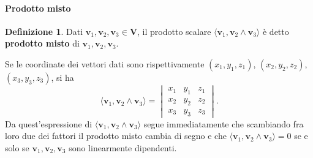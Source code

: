 \documentclass{article}
\theoremstyle{plain}
\theoremstyle{definition}
\newtheorem{defn}{Definizione}[section]
\theoremstyle{remark}
\begin{document}
\vspace{10pt}

\paragraph{Prodotto misto}
\begin{bxthm}
\begin{defn}
Dati $\mathbf{v}_1, \mathbf{v}_2, \mathbf{v}_3 \in \mathbf{V}$, il prodotto scalare 
$\langle \mathbf{v}_1, \mathbf{v}_2 \wedge \mathbf{v}_3 \rangle$ è detto \textbf{prodotto misto} 
di $\mathbf{v}_1, \mathbf{v}_2, \mathbf{v}_3$.
\end{defn}
\end{bxthm}

\vspace{10pt}

Se le coordinate dei vettori dati sono rispettivamente $(x_1, y_1, z_1)$, $(x_2, y_2, z_2)$, $(x_3, y_3, z_3)$, si ha
\[
\langle \mathbf{v}_1, \mathbf{v}_2 \wedge \mathbf{v}_3 \rangle = 
\begin{vmatrix}
x_1 & y_1 & z_1 \\
x_2 & y_2 & z_2 \\
x_3 & y_3 & z_3
\end{vmatrix}.
\]
Da quest'espressione di $\langle \mathbf{v}_1, \mathbf{v}_2 \wedge \mathbf{v}_3 \rangle$ segue immediatamente 
che scambiando fra loro due dei fattori il prodotto misto cambia di segno e che 
$\langle \mathbf{v}_1, \mathbf{v}_2 \wedge \mathbf{v}_3 \rangle = 0$ se e solo se 
$\mathbf{v}_1, \mathbf{v}_2, \mathbf{v}_3$ sono linearmente dipendenti.

\vspace{10pt}
\end{document}

